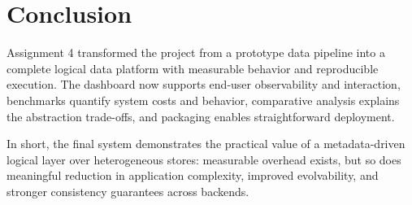 \documentclass[12pt,a4paper]{article}
\begin{document}

\section{Conclusion}

Assignment 4 transformed the project from a prototype data pipeline into a complete logical data platform with measurable behavior and reproducible execution. The dashboard now supports end-user observability and interaction, benchmarks quantify system costs and behavior, comparative analysis explains the abstraction trade-offs, and packaging enables straightforward deployment.

In short, the final system demonstrates the practical value of a metadata-driven logical layer over heterogeneous stores: measurable overhead exists, but so does meaningful reduction in application complexity, improved evolvability, and stronger consistency guarantees across backends.
\end{document}
